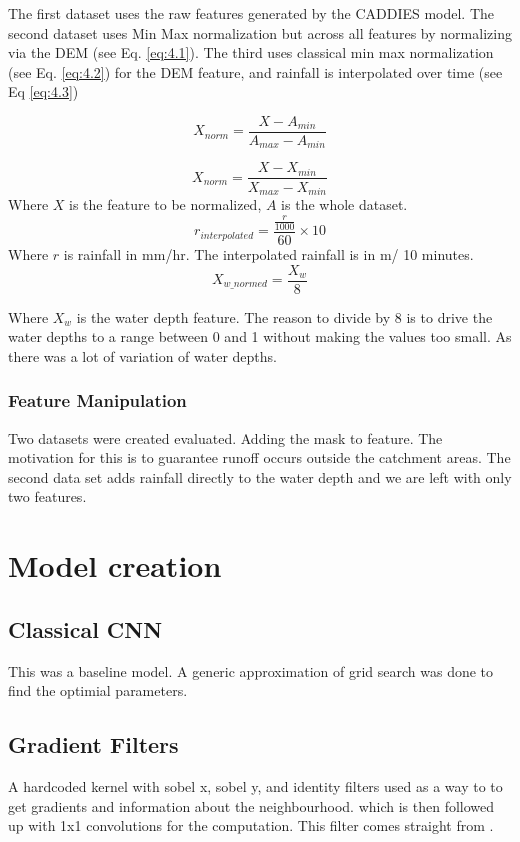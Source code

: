 The first dataset uses the raw features generated by the CADDIES model. The second dataset uses Min Max normalization but across all features by normalizing via the DEM (see Eq. \ref{eq:4.1}). The third uses classical min max normalization (see Eq. \ref{eq:4.2}) for the DEM feature, and rainfall is interpolated over time (see Eq \ref{eq:4.3})

\begin{equation}
	\label{eq:4.1}
	X_{norm} = \frac{X-A_{min}}{A_{max}-A_{min}}
\end{equation}

\begin{equation}
	\label{eq:4.2}
	X_{norm} = \frac{X-X_{min}}{X_{max}-X_{min}}
\end{equation}
Where $X$ is the feature to be normalized, $A$ is the whole dataset.
\begin{equation}
	\label{eq:4.3}
	r_{interpolated} = \frac{\frac{r}{1000}}{60} \times 10
\end{equation}
Where $r$ is rainfall in mm/hr. The interpolated rainfall is in m/ 10 minutes.
\begin{equation}
	X_{w \_ normed} = \frac{X_{w}}{8}  
\end{equation}

Where $X_{w}$ is the water depth feature. The reason to divide by 8 is to drive the water depths to a range between 0 and 1 without making the values too small. As there was a lot of variation of water depths.

\subsubsection*{Feature Manipulation}
Two datasets were created evaluated. Adding the mask to feature. The motivation for this is to guarantee  runoff occurs outside the catchment areas. The second data set adds rainfall directly to the water depth and we are left with only two features.


\section{Model creation}
\subsection{Classical CNN}
This was a baseline model. A generic approximation of grid search was done to find the optimial parameters.
\subsection{Gradient Filters}
A hardcoded kernel with sobel x, sobel y, and identity filters used as a way to to get gradients and information about the neighbourhood. which is then followed up with 1x1 convolutions for the computation. This filter comes straight from \cite{growing_nca}.

